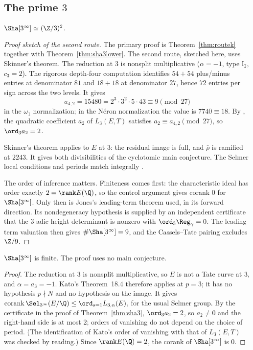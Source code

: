 \subsection[The prime 3]{The prime $3$}
\begin{theorem}\label{thm:sha3}
$\Sha[3^\infty]\simeq(\Z/3)^2$.
\end{theorem}
\begin{proof}[Proof sketch of the second route]
The primary proof is Theorem~\ref{thm:routek} together with Theorem~\ref{thm:sha3lower}. The second route, sketched here, uses Skinner's theorem. The reduction at $3$ is nonsplit multiplicative ($\alpha=-1$, type $\mathrm{I}_2$, $c_3=2$). The rigorous depth-four computation identifies $54+54$ plus/minus entries at denominator $81$ and $18+18$ at denominator $27$, hence $72$ entries per sign across the two levels. It gives
\[
a_{4,2}=15480=2^3\cdot3^2\cdot5\cdot43\equiv9\pmod{27}
\]
in the $\omega_1$ normalization; in the N\'eron normalization the value is $7740\equiv18$. By \cite[Prop.~3.5]{sw}, the quadratic coefficient $a_2$ of $L_3(E,T)$ satisfies $a_2\equiv a_{4,2}\pmod{27}$, so $\ord_3a_2=2$.

Skinner's theorem \cite[Thm.~A]{skinner} applies to $E$ at $3$: the residual image is full, and $\bar\rho$ is ramified at $2243$. It gives both divisibilities of the cyclotomic main conjecture. The Selmer local conditions and periods match integrally \cite{gv}.

The order of inference matters. Finiteness comes first: the characteristic ideal has order exactly $2=\rank E(\Q)$, so the control argument gives corank $0$ for $\Sha[3^\infty]$. Only then is Jones's leading-term theorem \cite[Thm.~3.1]{jones} used, in its forward direction. Its nondegeneracy hypothesis is supplied by an independent certificate that the $3$-adic height determinant is nonzero with $\ord_3\Reg_\gamma=0$. The leading-term valuation then gives $\#\Sha[3^\infty]=9$, and the Cassels--Tate pairing excludes $\Z/9$.
\end{proof}

\begin{theorem}\label{thm:sha3fin}
$\Sha[3^\infty]$ is finite. The proof uses no main conjecture.
\end{theorem}
\begin{proof}
The reduction at $3$ is nonsplit multiplicative, so $E$ is not a Tate curve at $3$, and $\alpha=a_3=-1$. Kato's Theorem~18.4 \cite{kato} therefore applies at $p=3$; it has no hypothesis $p\nmid N$ and no hypothesis on the image. It gives $\operatorname{corank}\Sel_{3^\infty}(E/\Q)\le\ord_{s=1}L_{3,\alpha}(E)$, for the usual Selmer group. By the certificate in the proof of Theorem~\ref{thm:sha3}, $\ord_3a_2=2$, so $a_2\ne0$ and the right-hand side is at most $2$; orders of vanishing do not depend on the choice of period. (The identification of Kato's order of vanishing with that of $L_3(E,T)$ was checked by reading.) Since $\rank E(\Q)=2$, the corank of $\Sha[3^\infty]$ is $0$.
\end{proof}

